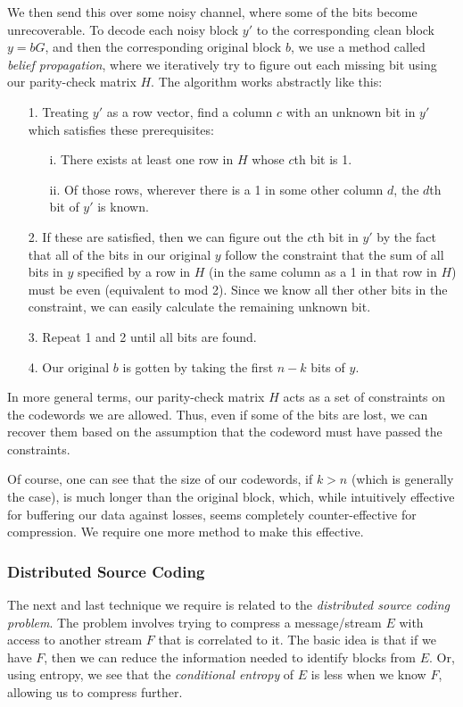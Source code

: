 \documentclass[11pt]{article}
\begin{document}
We then send this over some noisy channel, where some of the bits become unrecoverable. 
To decode each noisy block $y'$ to the corresponding clean block $y=bG$, and then the corresponding original block $b$, 
we use a method called \emph{belief propagation}, 
where we iteratively try to figure out each missing bit using our parity-check matrix $H$. 
The algorithm works abstractly like this:
\begin{itemize}
	\item[1.]Treating $y'$ as a row vector, find a column $c$ with an unknown bit in $y'$ which satisfies these prerequisites:
	\begin{itemize}
		\item[i.]There exists at least one row in $H$ whose $c$th bit is 1.
		\item[ii.]Of those rows, wherever there is a 1 in some other column $d$, the $d$th bit of $y'$ is known. 
	\end{itemize}
	\item[2.]If these are satisfied, then we can figure out the $c$th bit in $y'$ by the fact that all of the 
bits in our original $y$ follow the constraint that the sum of all bits in $y$ specified by a row in $H$ 
(in the same column as a 1 in that row in $H$) must be even (equivalent to mod 2). 
Since we know all ther other bits in the constraint, we can easily calculate the remaining unknown bit.
	\item[3.]Repeat 1 and 2 until all bits are found.
	\item[4.]Our original $b$ is gotten by taking the first $n-k$ bits of $y$.
\end{itemize}
In more general terms, our parity-check matrix $H$ acts as a set of constraints on the codewords we are 
allowed. Thus, even if some of the bits are lost, we can recover them based on the assumption that 
the codeword must have passed the constraints. 

Of course, one can see that the size of our codewords, if $k>n$ (which is generally the case), 
is much longer than the original block, which, 
while intuitively effective for buffering our data against losses, seems completely counter-effective for compression. 
We require one more method to make this effective. 

\subsubsection{Distributed Source Coding}\label{distributed-source-coding-subsubsect}
The next and last technique we require is related to the \emph{distributed source coding problem}\cite{johnson}. 
The problem involves trying to compress a message/stream $E$ with access to another stream $F$ 
that is correlated to it. The basic idea is that if we have $F$, then we can reduce the information 
needed to identify blocks from $E$. Or, using entropy, 
we see that the \emph{conditional entropy} of $E$ is less when we know $F$, 
allowing us to compress further. 
\end{document}
